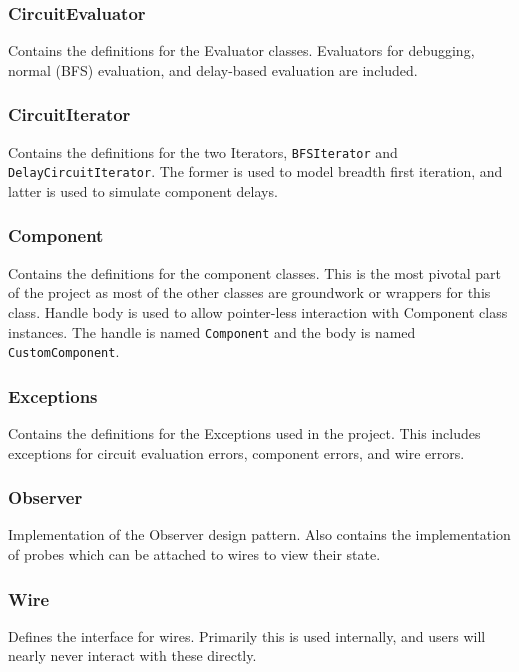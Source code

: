 \documentclass{article}
\newcommand{\ClassName}[1]{\texttt{#1}}
\begin{document}
\subsubsection{CircuitEvaluator}

Contains the definitions for the Evaluator classes. Evaluators for debugging, normal (BFS) evaluation, and delay-based evaluation are included.

\subsubsection{CircuitIterator}

Contains the definitions for the two Iterators, \ClassName{BFSIterator} and \ClassName{DelayCircuitIterator}. The former is used to model breadth first iteration, and latter is used to simulate component delays.

\subsubsection{Component}

Contains the definitions for the component classes. This is the most pivotal part of the project as most of the other classes are groundwork or wrappers for this class. Handle body is used to allow pointer-less interaction with Component class instances. The handle is named \ClassName{Component} and the body is named \ClassName{CustomComponent}.

\subsubsection{Exceptions}

Contains the definitions for the Exceptions used in the project. This includes exceptions for circuit evaluation errors, component errors, and wire errors.

\subsubsection{Observer}

Implementation of the Observer design pattern. Also contains the implementation of probes which can be attached to wires to view their state.

\subsubsection{Wire}

Defines the interface for wires. Primarily this is used internally, and users will nearly never interact with these directly.
\end{document}
